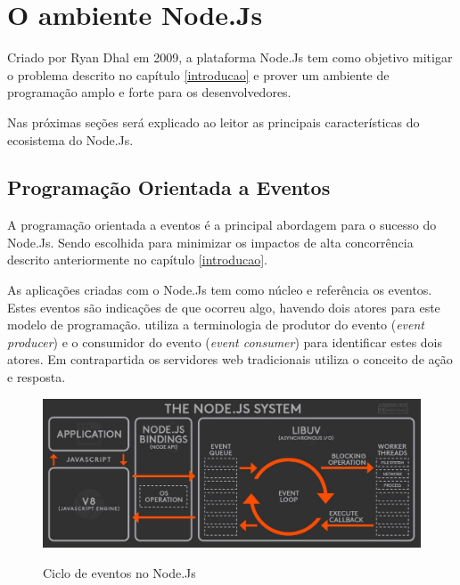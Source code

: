 \chapter{O ambiente Node.Js}
\label{ambiente-node-js}

\vspace{-1.9cm}


  Criado por Ryan Dhal em 2009, a plataforma Node.Js tem como objetivo mitigar o problema descrito no capítulo \ref{introducao}
  e prover um ambiente de programação amplo e forte para os desenvolvedores. 
  
  Nas próximas seções será explicado ao leitor as principais características do ecosistema do Node.Js.
 
  
\section{Programação Orientada a Eventos}
\label{programacao-orientada-a-eventos}

  A programação orientada a eventos é a principal abordagem para o sucesso do Node.Js. Sendo escolhida para
  minimizar os impactos de alta concorrência descrito anteriormente no capítulo \ref{introducao}. 
  
  As aplicações criadas com o Node.Js tem como núcleo e referência os eventos. Estes eventos são indicações de que ocorreu algo, 
  havendo dois atores para este modelo de programação.\cite{Oliveira:2012}
   utiliza a terminologia de produtor do evento (\textit{event producer}) 
  e o consumidor do evento (\textit{event consumer}) para identificar estes dois atores. Em contrapartida os servidores
  web tradicionais utiliza o conceito de ação e resposta.
  
  
  \begin{figure}[H]
    \setlength{\abovecaptionskip}{0pt}
    \setlength{\belowcaptionskip}{0pt}
    \caption[Ciclo de eventos no Node.Js]{Ciclo de eventos no Node.Js}
    \centering
    \includegraphics[width=.85\textwidth]{imagem/node-js-system-twitter-BusyRich.png}
    \captionsetup{justification=centering}
    \label{fig:node-js-system-loop}
  \end{figure}
  
